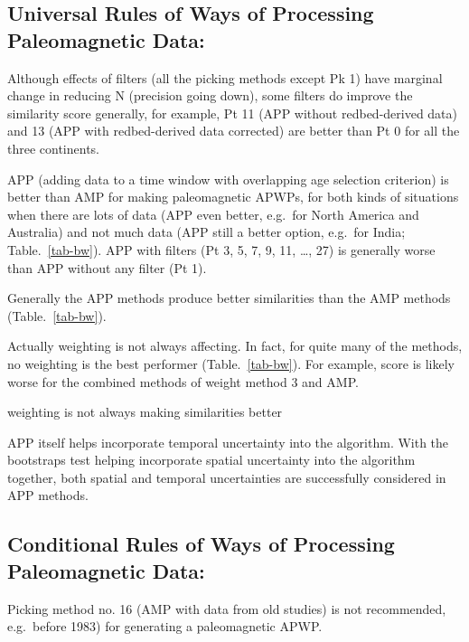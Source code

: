 \subsection{Universal Rules of Ways of Processing Paleomagnetic Data:}
%
\begin{description}
  \item Although effects of filters (all the picking methods except Pk 1) have
		marginal change in reducing N (precision going down), some filters do
		improve the similarity score generally, for example, Pt 11 (APP without
		redbed-derived data) and 13 (APP with redbed-derived data corrected) are
		better than Pt 0 for all the three continents.
  \item APP (adding data to a time window with overlapping age selection
	criterion) is better than AMP for making paleomagnetic APWPs, for both kinds
	of situations when there are lots of data (APP even better, e.g.\ for North
	America and Australia) and not much data (APP still a better option, e.g.\
	for India; Table.~\ref{tab-bw}). APP with filters (Pt 3, 5, 7, 9, 11,
	\ldots, 27) is generally worse than APP without any filter (Pt 1).
  \item Generally the APP methods produce better similarities than the AMP
        methods (Table.~\ref{tab-bw}).
  \item Actually weighting is not always affecting. In fact, for quite
	many of the methods, no weighting is the best performer
	(Table.~\ref{tab-bw}). For example, score is likely worse for the combined
	methods of weight method 3 and AMP.
  \item weighting is not always making similarities better
  \item APP itself helps incorporate temporal uncertainty into the algorithm.
		With the bootstraps test helping incorporate spatial uncertainty into
		the algorithm together, both spatial and temporal uncertainties are
		successfully considered in APP methods.
\end{description}

\subsection{Conditional Rules of Ways of Processing Paleomagnetic Data:}
%
\begin{description}
  \item Picking method no. 16 (AMP with data from old studies) is not
		recommended, e.g.\ before 1983) for generating a paleomagnetic APWP.
\end{description}


